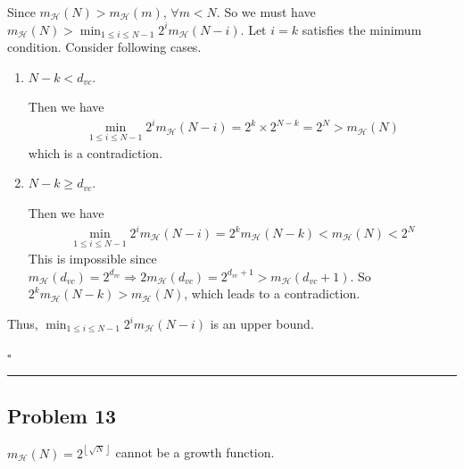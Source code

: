 \documentclass[12pt]{article}
\newcommand*{\QEDB}{\hfill\ensuremath{\square}}
\newcommand{\ParTh}[1]{\left(#1\right)}
\newcommand{\Floor}[1]{\left\lfloor#1\right\rfloor}
\newcommand{\horrule}[1]{\rule{\linewidth}{#1}}
\begin{document}
Since $m_{\mathcal{H}}\ParTh{N}>m_{\mathcal{H}}\ParTh{m}$, $\forall m<N$. So we must have $m_{\mathcal{H}}\ParTh{N}>\min_{1\leq i\leq N-1}2^im_{\mathcal{H}}\ParTh{N-i}$. Let $i=k$ satisfies the minimum condition. Consider following cases.
\begin{enumerate}
\item $N-k< d_{vc}$.

Then we have
\begin{align}
\min_{1\leq i\leq N-1}2^im_{\mathcal{H}}\ParTh{N-i}=2^k\times2^{N-k}=2^N>m_{\mathcal{H}}\ParTh{N}
\end{align}
which is a contradiction.
\item $N-k\geq d_{vc}$.

Then we have
\begin{align}
\min_{1\leq i\leq N-1}2^im_{\mathcal{H}}\ParTh{N-i}=2^km_{\mathcal{H}}\ParTh{N-k}<m_{\mathcal{H}}\ParTh{N}<2^N
\end{align}
This is impossible since $m_{\mathcal{H}}\ParTh{d_{vc}}=2^{d_{vc}}\Rightarrow2m_{\mathcal{H}}\ParTh{d_{vc}}=2^{d_{vc}+1}>m_{\mathcal{H}}\ParTh{d_{vc}+1}$. So $2^km_{\mathcal{H}}\ParTh{N-k}>m_{\mathcal{H}}\ParTh{N}$, which leads to a contradiction.

\end{enumerate}
Thus, $\min_{1\leq i\leq N-1}2^im_{\mathcal{H}}\ParTh{N-i}$ is an upper bound.

\QEDB

\horrule{0.5pt}

\subsection*{Problem 13}

$m_{\mathcal{H}}\ParTh{N}=2^{\Floor{\sqrt{N}}}$ cannot be a growth function.
\end{document}
